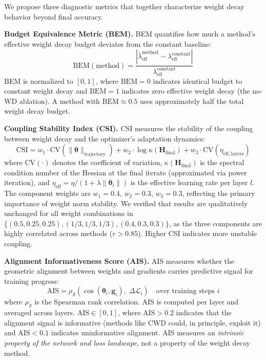 \documentclass[
]{article}
\begin{document}
We propose three diagnostic metrics that together characterize weight
decay behavior beyond final accuracy.

\textbf{Budget Equivalence Metric (BEM).} BEM quantifies how much a
method's effective weight decay budget deviates from the constant
baseline: \[
\mathrm{BEM}(\text{method}) = \frac{|\bar{\lambda}_{\mathrm{eff}}^{\text{method}} - \lambda_{\mathrm{eff}}^{\text{constant}}|}{\lambda_{\mathrm{eff}}^{\text{constant}}}
\] BEM is normalized to \([0, 1]\), where \(\mathrm{BEM} = 0\) indicates
identical budget to constant weight decay and \(\mathrm{BEM} = 1\)
indicates zero effective weight decay (the no-WD ablation). A method
with \(\mathrm{BEM} \approx 0.5\) uses approximately half the total
weight decay budget.

\textbf{Coupling Stability Index (CSI).} CSI measures the stability of
the coupling between weight decay and the optimizer's adaptation
dynamics: \[
\mathrm{CSI} = w_1 \cdot \mathrm{CV}(\|\boldsymbol{\theta}\|_{\text{trajectory}}) + w_2 \cdot \log \kappa(\mathbf{H}_{\text{final}}) + w_3 \cdot \mathrm{CV}(\eta_{\mathrm{eff}, \text{layers}})
\] where \(\mathrm{CV}(\cdot)\) denotes the coefficient of variation,
\(\kappa(\mathbf{H}_{\text{final}})\) is the spectral condition number
of the Hessian at the final iterate (approximated via power iteration),
and
\(\eta_{\mathrm{eff}} = \eta / (1 + \lambda \|\boldsymbol{\theta}_l\|)\)
is the effective learning rate per layer \(l\). The component weights
are \(w_1 = 0.4\), \(w_2 = 0.3\), \(w_3 = 0.3\), reflecting the primary
importance of weight norm stability. We verified that results are
qualitatively unchanged for all weight combinations in
\(\{(0.5, 0.25, 0.25), (1/3, 1/3, 1/3), (0.4, 0.3, 0.3)\}\), as the
three components are highly correlated across methods (\(r > 0.85\)).
Higher CSI indicates more unstable coupling.

\textbf{Alignment Informativeness Score (AIS).} AIS measures whether the
geometric alignment between weights and gradients carries predictive
signal for training progress: \[
\mathrm{AIS} = \rho_S\!\left(\cos(\boldsymbol{\theta}_i, \mathbf{g}_i),\; \Delta\mathcal{L}_i\right) \quad \text{over training steps } i
\] where \(\rho_S\) is the Spearman rank correlation. AIS is computed
per layer and averaged across layers. \(\mathrm{AIS} \in [0, 1]\), where
\(\mathrm{AIS} > 0.2\) indicates that the alignment signal is
informative (methods like CWD could, in principle, exploit it) and
\(\mathrm{AIS} < 0.1\) indicates uninformative alignment. AIS measures
an \emph{intrinsic property of the network and loss landscape}, not a
property of the weight decay method.
\end{document}
